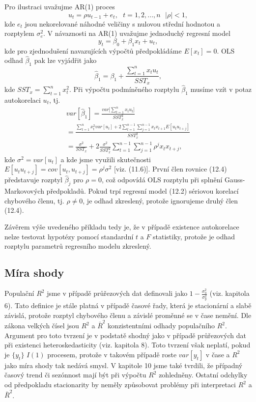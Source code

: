 Pro ilustraci uvažujme AR(1) proces
\begin{equation}
u_t = \rho u_{t - 1} + e_t, ~~~ t = 1, 2, ..., n ~~~ |\rho| < 1,
\end{equation}
kde $e_t$ jsou nekorelované náhodné veličiny s nulovou střední hodnotou a rozptylem $\sigma_e^2$. V návaznosti na AR(1) uvažujme jednoduchý regresní model
\begin{equation}
y_t = \beta_0 + \beta_1 x_t + u_t,
\end{equation}
kde pro zjednodušení navazujících výpočtů předpokládáme $E[x_t] = 0$. OLS odhad $\hat{\beta}_1$ pak lze vyjádřit jako
\begin{equation}
\hat{\beta}_1 = \beta_1 + \frac{\sum_{t = 1}^n x_t u_t}{SST_x},
\end{equation}
kde $SST_x = \sum_{t = 1}^n x_t^2$. Při výpočtu podmíněného rozptylu $\hat{\beta}_1$ musíme vzít v potaz autokorelaci $u_t$, tj.
\begin{multline}
  var[\hat{\beta}_1] = \frac{var\Big[\sum_{t = 1}^n x_t u_t \Big]}{SST_x^2}\\
  = \frac{\sum_{t = 1}^n x_t^2 var[u_t] + 2 \sum_{t = 1}^{n - 1}\sum_{j = 1}^{n - 1}x_tx_{t + 1}E[u_t u_{t + j}]}{SST_x^2}\\
  = \frac{\sigma^2}{SST_x} + 2\frac{\sigma^2}{SST_x^2}\sum_{t = 1}^{n - 1} \sum_{j = 1}^{n - 1} \rho^j x_t x_{t + j},
\end{multline}
kde $\sigma^2 = var[u_t]$ a kde jsme využili skutečnosti $E[u_t u_{t + j}] = cov[u_t, u_{t + j}] = \rho^j \sigma^2$ [viz. (11.6)]. První člen rovnice (12.4) představuje rozptyl $\hat{\beta}_j$ pro $\rho = 0$, což odpovídá OLS rozptylu při splnění Gauss-Markovových předpokladů. Pokud trpí regresní model (12.2) sériovou korelací chybového členu, tj. $\rho \ne 0$, je odhad zkreslený, protože ignorujeme druhý člen (12.4).

Závěrem výše uvedeného příkladu tedy je, že v případě existence autokorelace nelze testovat hypotézy pomocí standardní $t$ a $F$ statistiky, protože je odhad rozptylu parametrů regresního modelu zkreslený.

\subsection{Míra shody}

Populační $R^2$ jsme v případě průřezových dat definovali jako $1 - \frac{\sigma^2_u}{\sigma^2_y}$ (viz. kapitola 6). Tato definice je stále platná v případě časové řady, která je stacionární a slabě závislá, protože rozptyl chybového členu a závislé proměnné se v čase nemění. Dle zákona velkých čísel jsou $R^2$ a $\bar{R}^2$ konzistentními odhady populačního $R^2$. Argument pro toto tvrzení je v podstatě shodný jako v případě průřezových dat při existenci heteroskedasticity (viz. kapitola 8). Toto tvrzení však neplatí, pokud je $\{y_t\}$ $I(1)$ procesem, protože v takovém případě roste $var[y_t]$ v čase a $R^2$ jako míra shody tak nedává smysl. V kapitole 10 jsme také tvrdili, že případný časový trend či sezónnost mají být při výpočtu $R^2$ zohledněny. Ostatní odchylky od předpokladu stacionarity by neměly způsobovat problémy při interpretaci $R^2$ a $\bar{R}^2$.


